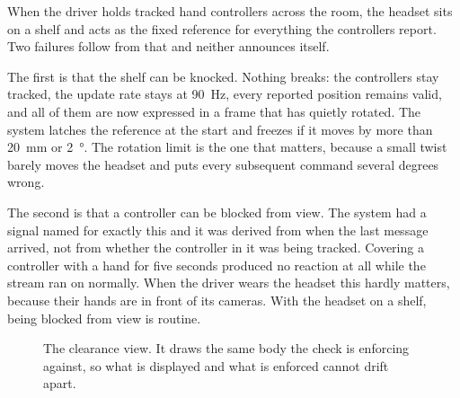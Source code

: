 When the driver holds tracked hand controllers across the room, the headset
sits on a shelf and acts as the fixed reference for everything the controllers
report. Two failures follow from that and neither announces itself.

The first is that the shelf can be knocked. Nothing breaks: the controllers
stay tracked, the update rate stays at \SI{90}{\hertz}, every reported position
remains valid, and all of them are now expressed in a frame that has quietly
rotated. The system latches the reference at the start and freezes if it moves
by more than \SI{20}{\milli\metre} or \SI{2}{\degree}. The rotation limit is the
one that matters, because a small twist barely moves the headset and puts every
subsequent command several degrees wrong.

The second is that a controller can be blocked from view. The system had a
signal named for exactly this and it was derived from when the last message
arrived, not from whether the controller in it was being tracked. Covering a
controller with a hand for five seconds produced no reaction at all while the
stream ran on normally. When the driver wears the headset this hardly matters,
because their hands are in front of its cameras. With the headset on a shelf,
being blocked from view is routine.

\begin{figure}[htbp]
  \centering
  \caption[The safety view]{The clearance view. It draws the same body the
  check is enforcing against, so what is displayed and what is enforced cannot
  drift apart.}
  \label{fig:safetyview}
\end{figure}
